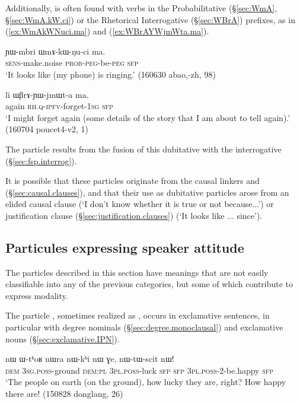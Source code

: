 Additionally,  is often found with verbs in the Probabilitative (§\ref{sec:WmA}, §\ref{sec:WmA.kW.ci})  or the Rhetorical Interrogative (§\ref{sec:WBrA}) prefixes, as in (\ref{ex:WmAkWNuci.ma}) and (\ref{ex:WBrAYWjmWta.ma}).

\begin{exe} 
\ex \label{ex:WmAkWNuci.ma}
\gll ɲɯ-mbri ɯmɤ-kɯ-ŋu-ci ma. \\
\textsc{sens}-make.noise \textsc{prob}-\textsc{peg}-be-\textsc{peg} \textsc{sfp} \\
\glt `It looks like (my phone) is ringing.' (160630 abao,-zh, 98)
 \end{exe} 

\begin{exe} 
\ex \label{ex:WBrAYWjmWta.ma}
\gll li ɯβrɤ-ɲɯ-jmɯt-a ma. \\
again \textsc{rh}.\textsc{q}-\textsc{ipfv}-forget-\textsc{1sg} \textsc{sfp} \\
\glt `I might forget again (some details of the story that I am about to tell again).' (160704 poucet4-v2, 1)
\end{exe} 

The particle  results from the fusion of this dubitative  with the interrogative  (§\ref{sec:fsp.interrog}).

It is possible that these particles originate from the causal linkers  and  (§\ref{sec:causal.clauses}), and that their use as dubitative particles arose from an elided causal clause (`I don't know whether it is true or not because...') or justification clause (§\ref{sec:justification.clauses}) (`It looks like ... since').

\subsection{Particules expressing speaker attitude} \label{sec:fsp.attitude}
The particles described in this section have meanings that are not easily classifiable into any of the previous categories, but some of which contribute to express modality.
 
The particle , sometimes realized as , occurs in exclamative sentences, in particular with degree nominals (§\ref{sec:degree.monoclausal}) and exclamative nouns (§\ref{sec:exclamative.IPN}).

\begin{exe} 
\ex \label{ex:nWtWscit.nW}
\gll  nɯ ɯ-tʰoʁ nɯra nɯ-kʰi nɯ ɣe, nɯ-tɯ-scit nɯ! \\
\textsc{dem} \textsc{3sg}.\textsc{poss}-ground \textsc{dem}:\textsc{pl} \textsc{3pl}.\textsc{poss}-luck \textsc{sfp} \textsc{sfp}  \textsc{3pl}.\textsc{poss}-2-be.happy \textsc{sfp} \\
\glt `The people on earth (on the ground), how lucky they are, right? How happy there are! (150828 donglang, 26)
\end{exe} 

